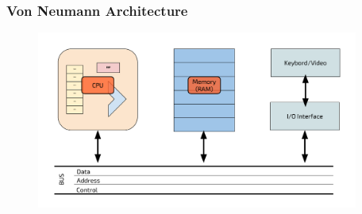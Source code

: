\documentclass[]{beamer}
\begin{document}
\begin{frame}
  \frametitle{Von Neumann Architecture}
  \begin{figure}
      \includegraphics[height=2.3in]{images/Von-Neumann-architecture.pdf}
    \end{figure}
\end{frame}
\end{document}
